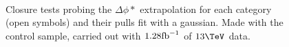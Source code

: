 \begin{figure}[h!]
  \begin{center}
    ~~
    \caption{Closure tests probing the $\Delta\phi *$ extrapolation for each
    \njet category (open symbols) and their pulls fit with a gaussian.
    Made with the \mj control sample, carried out with $1.28\text{fb}^{-1}$ of
      $13\tev$ data. }
    \label{fig:closureBDPhi}
  \end{center} 
\end{figure}

